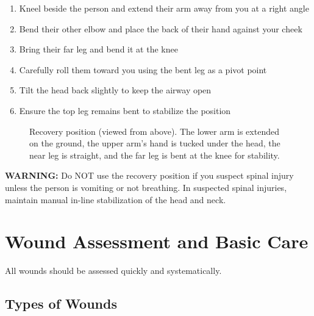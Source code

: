 \begin{enumerate}[leftmargin=*]
\item Kneel beside the person and extend their arm away from you at a right angle
\item Bend their other elbow and place the back of their hand against your cheek
\item Bring their far leg and bend it at the knee
\item Carefully roll them toward you using the bent leg as a pivot point
\item Tilt the head back slightly to keep the airway open
\item Ensure the top leg remains bent to stabilize the position
\end{enumerate}
\begin{figure}[h]
\centering
{}
\caption{Recovery position (viewed from above). The lower arm is extended on the ground, the upper arm's hand is tucked under the head, the near leg is straight, and the far leg is bent at the knee for stability.}
\label{fig:recovery_position}
\end{figure}

\textbf{WARNING:} Do NOT use the recovery position if you suspect spinal injury unless the person is vomiting or not breathing. In suspected spinal injuries, maintain manual in-line stabilization of the head and neck.

\section{Wound Assessment and Basic Care}

All wounds should be assessed quickly and systematically.

\subsection{Types of Wounds}


